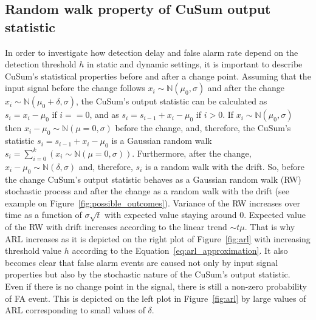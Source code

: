 \subsection{Random walk property of CuSum output statistic}
In order to investigate how detection delay and false alarm rate depend on the detection threshold $h$ in static and dynamic settings, it is important to describe CuSum's statistical properties before and after a change point.
Assuming that the input signal before the change follows
$x_i \sim \mathbb{N}(\mu_0, \sigma)$
and after the change
$x_i \sim \mathbb{N}(\mu_0 + \delta, \sigma)$, the
CuSum's output statistic can be calculated as
$s_i = x_i - \mu_0$ if $i == 0$,
and as
$s_i = s_{i-1} + x_i - \mu_0$ if $i > 0$.
%
If $x_i \sim \mathbb{N}(\mu_0, \sigma)$ then
$x_i - \mu_0 \sim \mathbb{N}(\mu=0, \sigma)$
before the change, and, therefore, the CuSum's statistic
$s_i =s_{i-1} + x_i - \mu_0$ is a Gaussian random walk
$s_i = \sum_{i=0}^{k} (x_i \sim \mathbb{N}(\mu=0, \sigma))$.
Furthermore, after the change,
$x_i - \mu_0 \sim \mathbb{N}(\delta, \sigma)$
and, therefore, $s_i$ is a random walk with the drift.
%
So, before the change CuSum's output statistic behaves as a Gaussian random walk (RW) stochastic process and after the change as a random walk with the drift (see example on Figure~\ref{fig:possible_outcomes}).
Variance of the RW increases over time as a function of $\sigma \sqrt{t}$ with expected value staying around $0$.
Expected value of the RW with drift increases according to the linear trend $\sim t \mu$.
That is why ARL increases as it is depicted on the right plot of Figure~\ref{fig:arl} with increasing threshold value $h$ according to the Equation~\ref{eq:arl_approximation}.
It also becomes clear that false alarm events are caused not only by input signal properties but also by the stochastic nature of the CuSum's output statistic.
Even if there is no change point in the signal, there is still a non-zero probability of FA event.
This is depicted on the left plot in Figure~\ref{fig:arl} by large values of ARL corresponding to small values of $\delta$.
%

